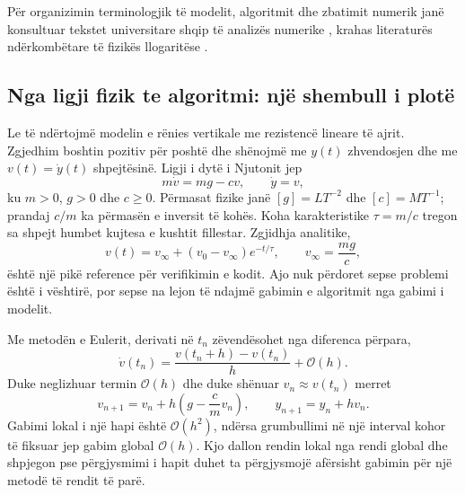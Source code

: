 \documentclass[11pt,oneside,openany]{book}
\newcommand{\Oh}{\mathcal{O}}
\begin{document}
Për organizimin terminologjik të modelit, algoritmit dhe zbatimit numerik janë konsultuar tekstet universitare shqip të analizës numerike \cite{hanelli,hoxha,datja}, krahas literaturës ndërkombëtare të fizikës llogaritëse \cite{newman,landau}.



\subsection{Nga ligji fizik te algoritmi: një shembull i plotë}
Le të ndërtojmë modelin e rënies vertikale me rezistencë lineare të ajrit. Zgjedhim boshtin pozitiv për poshtë dhe shënojmë me $y(t)$ zhvendosjen dhe me $v(t)=\dot y(t)$ shpejtësinë. Ligji i dytë i Njutonit jep
\begin{equation}
 m\dot v=mg-cv,\qquad \dot y=v,
\end{equation}
ku $m>0$, $g>0$ dhe $c\ge0$. Përmasat fizike janë $[g]=LT^{-2}$ dhe $[c]=MT^{-1}$; prandaj $c/m$ ka përmasën e inversit të kohës. Koha karakteristike $\tau=m/c$ tregon sa shpejt humbet kujtesa e kushtit fillestar. Zgjidhja analitike,
\begin{equation}
 v(t)=v_\infty+(v_0-v_\infty)e^{-t/\tau},\qquad v_\infty=\frac{mg}{c},
\end{equation}
është një pikë reference për verifikimin e kodit. Ajo nuk përdoret sepse problemi është i vështirë, por sepse na lejon të ndajmë gabimin e algoritmit nga gabimi i modelit.

Me metodën e Eulerit, derivati në $t_n$ zëvendësohet nga diferenca përpara,
\begin{equation}
 \dot v(t_n)=\frac{v(t_n+h)-v(t_n)}{h}+\Oh(h).
\end{equation}
Duke neglizhuar termin $\Oh(h)$ dhe duke shënuar $v_n\approx v(t_n)$ merret
\begin{equation}
 v_{n+1}=v_n+h\left(g-\frac{c}{m}v_n\right),\qquad y_{n+1}=y_n+hv_n.
\end{equation}
Gabimi lokal i një hapi është $\Oh(h^2)$, ndërsa grumbullimi në një interval kohor të fiksuar jep gabim global $\Oh(h)$. Kjo dallon rendin lokal nga rendi global dhe shpjegon pse përgjysmimi i hapit duhet ta përgjysmojë afërsisht gabimin për një metodë të rendit të parë.
\end{document}
